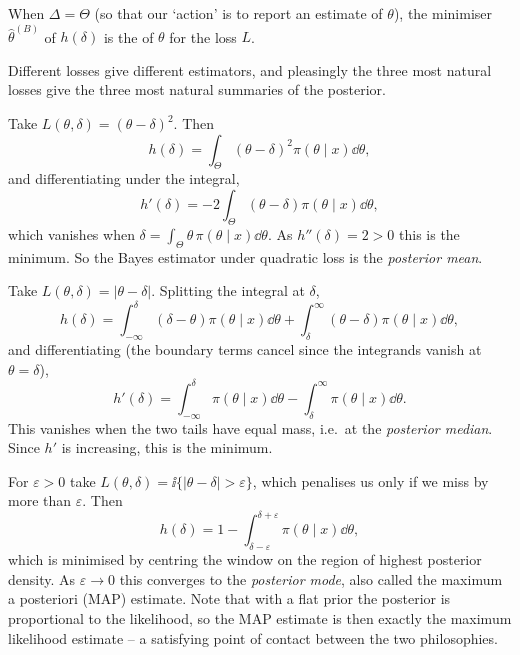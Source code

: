 \begin{definition}
  When $\Delta = \Theta$ (so that our `action' is to report an estimate of $\theta$), the minimiser $\hat\theta^{(B)}$ of $h(\delta)$ is the  of $\theta$ for the loss $L$.
\end{definition}

Different losses give different estimators, and pleasingly the three most natural losses give the three most natural summaries of the posterior.

\begin{example}
  Take $L(\theta,\delta) = (\theta - \delta)^2$. Then
  $$
  h(\delta) = \int_\Theta (\theta-\delta)^2 \pi(\theta\mid x)\dd\theta,
  $$
  and differentiating under the integral,
  $$
  h'(\delta) = -2\int_\Theta(\theta - \delta)\pi(\theta\mid x)\dd\theta,
  $$
  which vanishes when $\delta = \int_\Theta \theta\, \pi(\theta\mid x)\dd\theta$. As $h''(\delta) = 2 > 0$ this is the minimum. So the Bayes estimator under quadratic loss is the \emph{posterior mean}.
\end{example}

\begin{example}
  Take $L(\theta,\delta) = |\theta - \delta|$. Splitting the integral at $\delta$,
  $$
  h(\delta) = \int_{-\infty}^{\delta}(\delta - \theta)\pi(\theta\mid x)\dd\theta + \int_{\delta}^{\infty}(\theta - \delta)\pi(\theta\mid x)\dd\theta,
  $$
  and differentiating (the boundary terms cancel since the integrands vanish at $\theta = \delta$),
  $$
  h'(\delta) = \int_{-\infty}^{\delta}\pi(\theta\mid x)\dd\theta - \int_{\delta}^{\infty}\pi(\theta\mid x)\dd\theta.
  $$
  This vanishes when the two tails have equal mass, i.e.\ at the \emph{posterior median}. Since $h'$ is increasing, this is the minimum.
\end{example}

\begin{example}
  For $\varepsilon > 0$ take $L(\theta,\delta) = \ii\{|\theta - \delta| > \varepsilon\}$, which penalises us only if we miss by more than $\varepsilon$. Then
  $$
  h(\delta) = 1 - \int_{\delta - \varepsilon}^{\delta+\varepsilon}\pi(\theta\mid x)\dd\theta,
  $$
  which is minimised by centring the window on the region of highest posterior density. As $\varepsilon \to 0$ this converges to the \emph{posterior mode}, also called the maximum a posteriori (MAP) estimate. Note that with a flat prior the posterior is proportional to the likelihood, so the MAP estimate is then exactly the maximum likelihood estimate -- a satisfying point of contact between the two philosophies.
\end{example}

